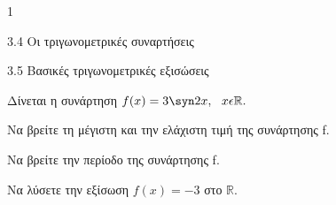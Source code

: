 \begin{ylh}{1}
\item 3.4 Οι τριγωνομετρικές συναρτήσεις
\item 3.5 Βασικές τριγωνομετρικές εξισώσεις
\end{ylh}
Δίνεται η συνάρτηση $f(x) = 3\syn  2x,\ \ x\epsilon\mathbb{R}.$
\begin{alist}
\item
\begin{rlist}
\item Να βρείτε τη μέγιστη και την ελάχιστη τιμή της συνάρτησης f.
\item Να βρείτε την περίοδο της συνάρτησης f.
\end{rlist}
\item Να λύσετε την εξίσωση $f(x) = - 3$ στο $\mathbb{R}.$
\end{alist}

